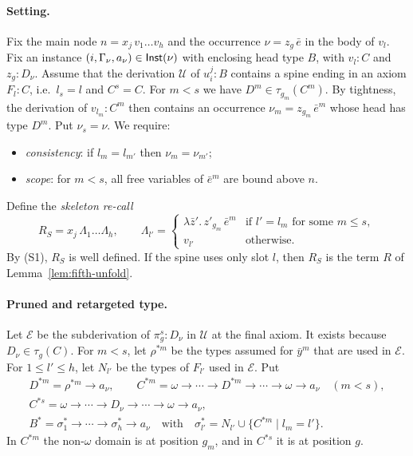 \documentclass[10pt,a4paper]{article}
\theoremstyle{plain}%
\begin{document}
\paragraph{Setting.}
Fix the main node $n = x_j\,v_1\ldots v_h$ and the occurrence $\nu = z_g\,\bar e$ in the body of $v_l$.
Fix an instance $(i,\Gamma_\nu,a_\nu) \in \mathsf{Inst}(\nu)$ with enclosing head type $B$, with $v_l : C$ and $z_g : D_\nu$.
Assume that the derivation $\mathcal{U}$ of $u_i^j : B$ contains a spine ending in an axiom $F_l : C$, i.e.\ $l_s = l$ and $C^s = C$.
For $m < s$ we have $D^m \in \tau_{g_m}(C^m)$.
By tightness, the derivation of $v_{l_m} : C^m$ then contains an occurrence $\nu_m = z_{g_m}\,\bar e^m$ whose head has type $D^m$.
Put $\nu_s = \nu$.
We require:
\begin{itemize}
\item[(S1)] \emph{consistency}: if $l_m = l_{m'}$ then $\nu_m = \nu_{m'}$;
\item[(S2)] \emph{scope}: for $m < s$, all free variables of $\bar e^m$ are bound above $n$.
\end{itemize}
Define the \emph{skeleton re-call}
\[
R_S = x_j\,\Lambda_1\ldots\Lambda_h,
\qquad
\Lambda_{l'} =
\begin{cases}
\lambda \bar z'.\,z'_{g_m}\,\bar e^m & \text{if } l' = l_m \text{ for some } m \le s,\\
v_{l'} & \text{otherwise.}
\end{cases}
\]
By (S1), $R_S$ is well defined.
If the spine uses only slot $l$, then $R_S$ is the term $R$ of Lemma~\ref{lem:fifth-unfold}.

\paragraph{Pruned and retargeted type.}
Let $\mathcal{E}$ be the subderivation of $\pi^s_g : D_\nu$ in $\mathcal{U}$ at the final axiom.
It exists because $D_\nu \in \tau_g(C)$.
For $m < s$, let $\rho^{*m}$ be the types assumed for $\bar y^m$ that are used in $\mathcal{E}$.
For $1 \le l' \le h$, let $N_{l'}$ be the types of $F_{l'}$ used in $\mathcal{E}$.
Put
\[
\begin{array}{l}
D^{*m} = \rho^{*m} \to a_\nu,
\qquad
C^{*m} = \omega \to \cdots \to D^{*m} \to \cdots \to \omega \to a_\nu \quad (m < s),\\[1ex]
C^{*s} = \omega \to \cdots \to D_\nu \to \cdots \to \omega \to a_\nu,\\[1ex]
B^* = \sigma^*_1 \to \cdots \to \sigma^*_h \to a_\nu
\quad\text{with}\quad
\sigma^*_{l'} = N_{l'} \cup \{C^{*m} \mid l_m = l'\}.
\end{array}
\]
In $C^{*m}$ the non-$\omega$ domain is at position $g_m$, and in $C^{*s}$ it is at position $g$.
\end{document}
